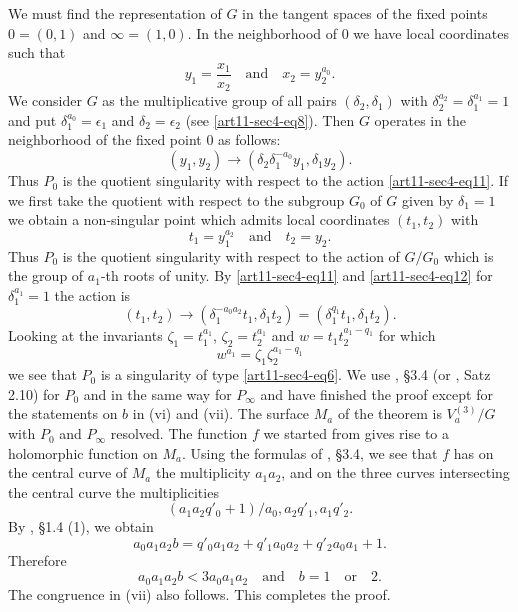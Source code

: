 We must find the representation of $G$ in the tangent spaces of the fixed points $0=(0,1)$ and $\infty=(1,0)$. In the neighborhood of $0$ we have local coordinates such that
\begin{equation*}
y_{1}=\dfrac{x_{1}}{x_{2}}\quad\text{and}\quad x_{2}=y^{a_{0}}_{2}.\tag{10}\label{art11-sec4-eq10}
\end{equation*}
We consider $G$ as the multiplicative group of all pairs $(\delta_{2},\delta_{1})$ with $\delta^{a_{2}}_{2}=\delta^{a_{1}}_{1}=1$ and put $\delta^{a_{0}}_{1}=\epsilon_{1}$ and $\delta_{2}=\epsilon_{2}$ (see \eqref{art11-sec4-eq8}). Then $G$ operates in the neighborhood of the fixed point $0$ as follows:
\begin{equation*}
(y_{1},y_{2})\to (\delta_{2}\delta^{-a_{0}}_{1}y_{1}, \delta_{1}y_{2}).\tag{11}\label{art11-sec4-eq11}
\end{equation*}
Thus $P_{0}$ is the quotient singularity with respect to the action \eqref{art11-sec4-eq11}. If we first take the quotient with respect to the subgroup $G_{0}$ of $G$ given by $\delta_{1}=1$ we obtain a non-singular point which admits local coordinates $(t_{1},t_{2})$ with
\begin{equation*}
t_{1}=y^{a_{2}}_{1}\quad\text{and}\quad t_{2}=y_{2}.\tag{12}\label{art11-sec4-eq12}
\end{equation*}
Thus $P_{0}$ is the quotient singularity with respect to the action of $G/G_{0}$ which is the group of $a_{1}$-th roots of unity. By \eqref{art11-sec4-eq11} and \eqref{art11-sec4-eq12} for $\delta^{a_{1}}_{1}=1$ the action is
\begin{equation*}
(t_{1},t_{2})\to (\delta^{-a_{0}a_{2}}_{1}t_{1},\delta_{1}t_{2})=(\delta^{q_{1}}_{1}t_{1},\delta_{1}t_{2}).\tag{13}\label{art11-sec4-eq13}
\end{equation*}
Looking at the invariants $\zeta_{1}=t^{a_{1}}_{1}$, $\zeta_{2}=t^{a_{1}}_{2}$ and $w=t_{1}t^{a_{1}-q_{1}}_{2}$ for which
$$
w^{a_{1}}=\zeta_{1}\zeta^{a_{1}-q_{1}}_{2}
$$
we see that $P_{0}$ is a singularity of type \eqref{art11-sec4-eq6}. We use \cite{art11-key6}, \S3.4 (or \cite{art11-key2}, Satz 2.10) for $P_{0}$ and in the same way for $P_{\infty}$ and have finished the proof except for the statements on $b$ in (vi) and (vii). The surface $M_{a}$ of the theorem is $V^{(3)}_{a}/G$ with $P_{0}$ and $P_{\infty}$ resolved. The function $f$ we started from gives rise to a holomorphic function on $M_{a}$. Using the formulas of \cite{art11-key6}, \S3.4, we see that $f$ has on the central curve of $M_{a}$ the multiplicity $a_{1}a_{2}$, and on the three curves intersecting the central curve the multiplicities 
$$
(a_{1}a_{2}q'_{0}+1)/a_{0},a_{2}q'_{1},a_{1}q'_{2}.
$$\pageoriginale
By \cite{art11-key6}, \S1.4 (1), we obtain
$$
a_{0}a_{1}a_{2}b=q'_{0}a_{1}a_{2}+q'_{1}a_{0}a_{2}+q'_{2}a_{0}a_{1}+1.
$$
Therefore
$$
a_{0}a_{1}a_{2}b<3a_{0}a_{1}a_{2}\quad\text{and}\quad b=1\quad\text{or}\quad 2.
$$
The congruence in (vii) also follows. This completes the proof.

